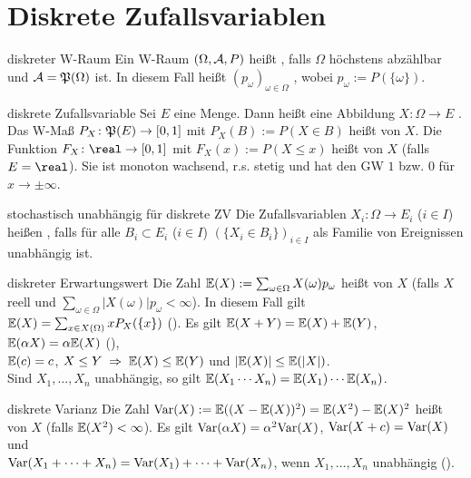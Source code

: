 \section{%
    Diskrete Zufallsvariablen%
}

\begin{Def}{diskreter W-Raum}
    Ein W-Raum $(\Omega, \mathcal{A}, P)$ heißt , falls $\Omega$ höchstens abzählbar und
    $\mathcal{A} = \mathfrak{P}(\Omega)$ ist.
    In diesem Fall heißt
    $(p_\omega)_{\omega \in \Omega}$ , wobei $p_\omega := P(\{\omega\})$.
\end{Def}

\begin{Def}{diskrete Zufallsvariable}
    Sei $E$ eine Menge.
    Dann heißt eine Abbildung $X\colon \Omega \rightarrow E$ .
    Das W-Maß $P_X\colon \mathfrak{P}(E) \rightarrow [0, 1]$ mit $P_X(B) := P(X \in B)$ heißt
     von $X$.
    Die Funktion $F_X\colon \real \rightarrow [0, 1]$ mit $F_X(x) := P(X \le x)$ heißt
     von $X$
    (falls $E = \real$).
    Sie ist monoton wachsend, r.s. stetig und
    hat den GW $1$ bzw. $0$ für $x \to \pm\infty$.
\end{Def}

\begin{Def}{stochastisch unabhängig für diskrete ZV}
    Die Zufallsvariablen $X_i\colon \Omega \rightarrow E_i$ ($i \in I$)
    heißen , falls für alle $B_i \subset E_i$ ($i \in I$)
    $(\{X_i \in B_i\})_{i \in I}$ als Familie von Ereignissen unabhängig ist.
\end{Def}

\begin{Def}{diskreter Erwartungswert}
    Die Zahl $\mathbb{E}(X) := \sum_{\omega \in \Omega} X(\omega) p_\omega$ heißt
     von $X$
    (falls $X$ reell und $\sum_{\omega \in \Omega} |X(\omega)| p_\omega < \infty$).
    In diesem Fall gilt $\mathbb{E}(X) = \sum_{x \in X(\Omega)} x P_X(\{x\})$
    ().
    Es gilt
    $\mathbb{E}(X + Y) = \mathbb{E}(X) + \mathbb{E}(Y)$, $\mathbb{E}(\alpha X) = \alpha \mathbb{E}(X)$ (),\\
    $\mathbb{E}(c) = c$,
    $X \le Y \;\Rightarrow\; \mathbb{E}(X) \le \mathbb{E}(Y)$ und
    $|\mathbb{E}(X)| \le \mathbb{E}(|X|)$.\\
    Sind $X_1, \dotsc, X_n$ unabhängig, so gilt $\mathbb{E}(X_1 \dotsm X_n) = \mathbb{E}(X_1) \dotsm \mathbb{E}(X_n)$.
\end{Def}

\begin{Def}{diskrete Varianz}
    Die Zahl $\mathrm{Var}(X) := \mathbb{E}((X - \mathbb{E}(X))^2) = \mathbb{E}(X^2) - \mathbb{E}(X)^2$ heißt 
    von $X$ (falls $\mathbb{E}(X^2) < \infty$).
    Es gilt $\mathrm{Var}(\alpha X) = \alpha^2 \mathrm{Var}(X)$, $\mathrm{Var}(X + c) = \mathrm{Var}(X)$ und\\
    $\mathrm{Var}(X_1 + \dotsb + X_n) = \mathrm{Var}(X_1) + \dotsb + \mathrm{Var}(X_n)$,
    wenn $X_1, \dotsc, X_n$ unabhängig ().
\end{Def}

